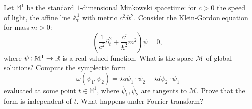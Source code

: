 \documentclass{pset}
\begin{document}
\begin{problem}{2}
  Let $\mathbb{M}^1$ be the standard $1$-dimensional Minkowski spacetime: for $c>0$ the speed of light, the affine line $\mathbb{A}^1_t$ with metric $c^2dt^2$. Consider the Klein-Gordon equation for mass $m>0$:
  \[
    \left(\frac{1}{c^2}\partial^2_t + \frac{c^2}{\hbar^2}m^2\right)\psi = 0,
  \]
  where $\psi : \mathbb{M}^1 \to \mathbb{R}$ is a real-valued function. What is the space $\mathcal{M}$ of global solutions? Compute the symplectic form
  \[
    \omega(\dot{\psi_1}, \dot{\psi_2}) = \star d \dot{\psi_1}\cdot \dot{\psi_2} - \star d\dot{\psi_2}\cdot \dot{\psi_1}
  \]
  evaluated at some point $t\in \mathbb{M}^1$, where $\dot{\psi_1}, \dot{\psi_2}$ are tangents to $\mathcal{M}$. Prove that the form is independent of $t$. What happens under Fourier transform?
\end{problem}
\end{document}
